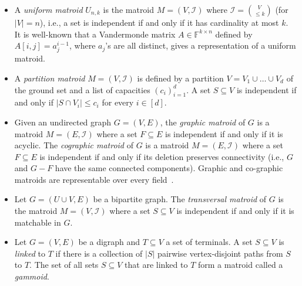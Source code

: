 \documentclass[10pt,a4paper]{article}
\newcommand{\cI}{\ensuremath{\mathcal I}\xspace}
\begin{document}
\begin{itemize}
\item A \emph{uniform matroid} $U_{n,k}$ is the matroid $M=(V,\cI)$
  where $\cI=\binom{V}{\leq k}$ (for $|V|=n$), i.e., a set is
  independent if and only if it has cardinality at most $k$.
  It is well-known that a Vandermonde matrix $A \in \mathbb{F}^{k \times n}$ defined by $A[i,j] = a_j^{i-1}$, where $a_j$'s are all distinct, gives a representation of a uniform matroid.

\item A \emph{partition matroid} $M=(V,\cI)$ is defined by a partition
  $V=V_1 \cup \ldots \cup V_d$ of the ground set and a list of
  capacities $(c_i)_{i=1}^d$. A set $S \subseteq V$ is independent if
  and only if $|S \cap V_i| \leq c_i$ for every $i \in [d]$.

\item Given an undirected graph $G=(V,E)$, the \emph{graphic matroid}
  of $G$ is a matroid $M=(E,\cI)$ where a set $F \subseteq E$ is
  independent if and only if it is acyclic. The \emph{cographic matroid}
  of $G$ is a matroid $M=(E,\cI)$ where a set $F \subseteq E$ is
  independent if and only if its deletion preserves connectivity (i.e., $G$ and
  $G-F$ have the same connected components). Graphic and co-graphic matroids
  are representable over every field~\cite{OxleyBook}.
  
\item Let $G=(U \cup V,E)$ be a bipartite graph. The \emph{transversal
    matroid} of $G$ is the matroid $M=(V,\cI)$ where a set
  $S \subseteq V$ is independent if and only if it is matchable in
  $G$.
\item Let $G=(V,E)$ be a digraph and $T \subseteq V$ a set of
  terminals. A set $S \subseteq V$ is \emph{linked} to $T$ if there is
  a collection of $|S|$ pairwise vertex-disjoint paths from $S$ to $T$.
  The set of all sets $S \subseteq V$ that are linked to $T$ form a
  matroid called a \emph{gammoid}.
\end{itemize}
\end{document}

